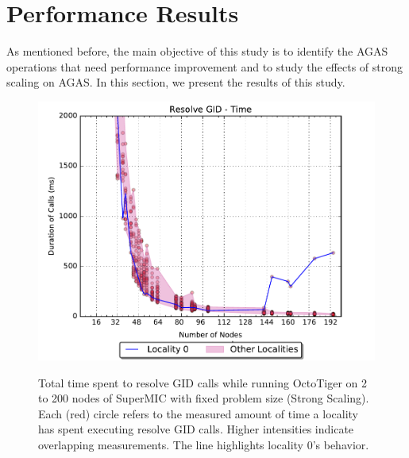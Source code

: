 \section{Performance Results}
\label{results}

As mentioned before, the main objective of this study is to identify the AGAS
operations that need performance improvement and to study the effects of strong
scaling on AGAS. In this section, we present the results of this study.

\begin{figure}[h]
    \centering
    \vspace{2.5cm}
    \caption{Total time spent to resolve GID calls while running OctoTiger on 2 to 200 nodes of SuperMIC with fixed problem size (Strong Scaling). Each (red) circle refers to the measured amount of time a locality has spent executing resolve GID calls. Higher intensities indicate overlapping measurements. The line highlights locality 0's behavior.}
    \includegraphics[width=.67\textwidth,height=\textheight,keepaspectratio]{graphs/octotiger_resolve_gid_time}
    \label{fig:octgr_strong_resolve_gid_time}
\end{figure}

